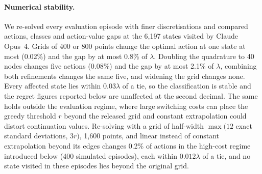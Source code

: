 \documentclass[10pt,a4paper,twocolumn]{article}
\begin{document}
\paragraph{Numerical stability.}\label{sec:numerics} We re-solved every evaluation episode with finer discretisations and compared actions, classes and action-value gaps at the 6{,}197 states visited by Claude Opus~4. Grids of 400 or 800 points change the optimal action at one state at most (0.02\%) and the gap by at most 0.8\% of $\lambda$. Doubling the quadrature to 40 nodes changes five actions (0.08\%) and the gap by at most 2.1\% of $\lambda$, combining both refinements changes the same five, and widening the grid changes none. Every affected state lies within $0.03\lambda$ of a tie, so the classification is stable and the regret figures reported below are unaffected at the second decimal. The same holds outside the evaluation regime, where large switching costs can place the greedy threshold $r$ beyond the released grid and constant extrapolation could distort continuation values. Re-solving with a grid of half-width $\max(12$ exact standard deviations$,\,3r)$, 1{,}600 points, and linear instead of constant extrapolation beyond its edges changes 0.2\% of actions in the high-cost regime introduced below (400 simulated episodes), each within $0.012\lambda$ of a tie, and no state visited in these episodes lies beyond the original grid.
\end{document}

